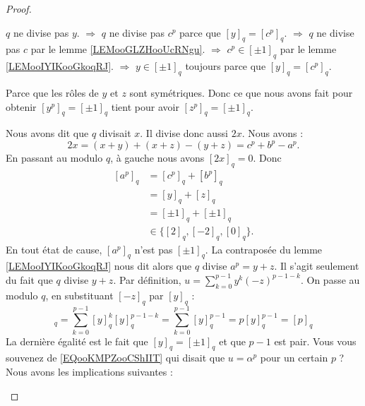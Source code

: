 \begin{proof}
\begin{subproof}
		\( q\) ne divise pas \( y\).\newline
		\( \Rightarrow\) \( q\) ne divise pas \( c^p\) parce que \( [y]_q=[c^p]_q\).\newline
		\( \Rightarrow\) \( q\) ne divise pas \( c\) par le lemme \ref{LEMooGLZHooUcRNgu}.\newline
		\( \Rightarrow\) \( c^p\in[\pm 1]_q\) par le lemme \ref{LEMooIYIKooGkoqRJ}.\newline
		\( \Rightarrow\) \( y\in[\pm 1]_q\) toujours parce que \( [y]_q=[c^p]_q\).

		\spitem[\( {[z^p]_q=[\pm 1]_q}\)]
		Parce que les rôles de \( y\) et \( z\) sont symétriques. Donc ce que nous avons fait pour obtenir \( [y^p]_q=[\pm1]_q\) tient pour avoir \( [z^p]_q=[\pm 1]_q\).

		\spitem[\( q\) divise \( y+z\)]
		Nous avons dit que \( q\) divisait \( x\). Il divise donc aussi \( 2x\). Nous avons :
		\begin{equation}
			2x=(x+y)+(x+z)-(y+z)=c^p+b^p-a^p.
		\end{equation}
		En passant au modulo \( q\), à gauche nous avons \( [2x]_q=0\). Donc
		\begin{subequations}
			\begin{align}
				[a^p]_q & =[c^p]_q+[b^p]_q             \\
				        & =[y]_q+[z]_q                 \\
				        & =[\pm 1]_q+[\pm 1]_q         \\
				        & \in\{ [2]_q,[-2]_q,[0]_q \}.
			\end{align}
		\end{subequations}
		En tout état de cause, \( [a^p]_q\) n'est pas \( [\pm 1]_q\). La contraposée du lemme \ref{LEMooIYIKooGkoqRJ} nous dit alors que \( q\) divise \( a^p=y+z\).
		\spitem[\( {[y]_q=[-z]_q}\)]
		Il s'agit seulement du fait que \( q\) divise \( y+z\).
		\spitem[\( {[u]_q=[p]_q}\)]
		Par définition, \( u=\sum_{k=0}^{p-1}y^k(-z)^{p-1-k}\). On passe au modulo \( q\), en substituant \( [-z]_q\) par \( [y]_q\) :
		\begin{equation}
			[u]_q=\sum_{k=0}^{p-1}[y]_q^k[y]_q^{p-1-k}
			=\sum_{k=0}^{p-1}[y]_q^{p-1}
			=p[y]_q^{p-1}
				=[p]_q
		\end{equation}
		La dernière égalité est le fait que \( [y]_q=[\pm 1]_q\) et que \( p-1\) est pair.
		\spitem[La contradiction]
		Vous vous souvenez de \eqref{EQooKMPZooCShIIT} qui disait que \( u=\alpha^p\) pour un certain \( p\) ? Nous avons les implications suivantes :


\end{subproof}
\end{proof}
